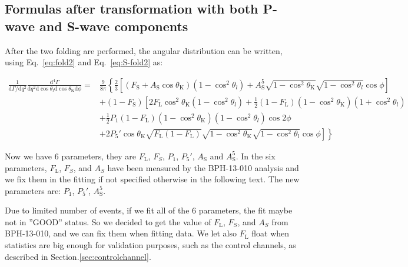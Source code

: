 \subsection{Formulas after transformation with both P-wave and S-wave components}
\label{sec:finalform}

After the two folding are performed, the angular distribution can be
written, using  Eq.~\ref{eq:fold2} and Eq.~\ref{eq:S-fold2} as:

\begin{equation} \label{eq:PDF-f2}
  \begin{split}
  \frac{1}{\mathrm{d}\Gamma/\mathrm{d}q^2}\frac{\mathrm{d}^4\Gamma}{\mathrm{d}q^2 \mathrm{d}\cos\theta_l \mathrm{d}\cos\theta_\mathrm{K} \mathrm{d}\phi} =&\frac{9}{8\pi}\left\{\frac{2}{3}\left[ (F_\mathrm{S}+A_\mathrm{S}\cos\theta_\mathrm{K})\left(1-\cos^2\theta_l\right) + A^5_\mathrm{S}\sqrt{1-\cos^2\theta_\mathrm{K}}\sqrt{1-\cos^2\theta_l}\cos\phi \right] \right.\\
 & + \left(1 - F_\mathrm{S}\right)\left[2F_\mathrm{L}\cos^2\theta_\mathrm{K}\left(1-\cos^2\theta_l\right)+\frac{1}{2}\left(1-F_\mathrm{L}\right)\left(1-\cos^2\theta_\mathrm{K}\right)\left(1+\cos^2\theta_l\right) \right.\\
 & + \frac{1}{2}P_1(1-F_\mathrm{L})(1-\cos^2\theta_\mathrm{K})(1-\cos^2\theta_l)\cos 2\phi \\
 & \left.\left. + 2P_5'\cos\theta_\mathrm{K}\sqrt{F_\mathrm{L}\left(1-F_\mathrm{L}\right)}\sqrt{1-\cos^2\theta_\mathrm{K}}\sqrt{1-\cos^2\theta_l}\cos\phi\right]\right\}
 \end{split}
\end{equation}

Now we have 6 parameters, they are $F_\mathrm{L}$, $F_S$, $P_1$, $P_5'$, $A_\mathrm{S}$
and $A^5_\mathrm{S}$.  In the six parameters, $F_\mathrm{L}$, $F_S$, and $A_S$ have been
measured by the BPH-13-010 analysis and we fix them in the
fitting if not specified otherwise in the following text. The new parameters are: $P_1$, $P_5'$, $A^5_\mathrm{S}$.

Due to limited number of events, if we fit all of the 6 parameters, the fit
maybe not in ''GOOD'' status. So we decided to get the value of $F_\mathrm{L}$, $F_S$, 
and $A_S$ from BPH-13-010, and we can fix them when fitting data.
We let also $F_\mathrm{L}$ float when statistics are big enough for validation purposes,
such as the control channels, as described in Section.\ref{sec:controlchannel}.

